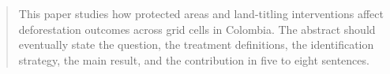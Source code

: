 \begin{abstract}
This paper studies how protected areas and land-titling interventions affect deforestation outcomes across grid cells in Colombia. The abstract should eventually state the question, the treatment definitions, the identification strategy, the main result, and the contribution in five to eight sentences.
\end{abstract}
